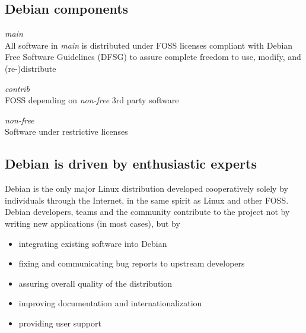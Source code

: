 \documentclass[letterpaper,landscape]{report}
\begin{document}
\begin{multicols}{3}
\subsection*{Debian components}


\begin{description}[nolistsep,leftmargin=1pc,topsep=1em]
\item[Free as in freedom]\hfill\emph{main}\\
  All software in \emph{main} is distributed under FOSS licenses
  compliant with Debian Free Software Guidelines (DFSG) to assure
  complete freedom to use, modify, and (re-)distribute
\item[Not free \emph{en bloc}]\hfill\emph{contrib}\\
  FOSS depending on \emph{non-free} 3rd party software
\item[Somewhat free]\hfill\emph{non-free}\\
  Software under restrictive licenses
\end{description}


\subsection*{Debian is driven by enthusiastic experts}

Debian is the only major Linux distribution developed
cooperatively solely by individuals through the Internet, in the
same spirit as Linux and other FOSS.\\
Debian developers, teams and the community contribute to the
project not by writing new applications (in most cases), but by
\begin{itemize}[nolistsep,topsep=0em,leftmargin=1pc]
\item integrating existing software into Debian
\item fixing and communicating bug reports to upstream developers
\item assuring overall quality of the distribution
\item improving documentation and internationalization
\item providing user support
\end{itemize}


\end{multicols}
\end{document}
